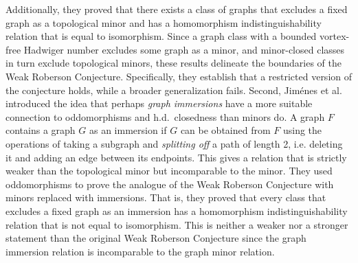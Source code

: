 \documentclass[11pt]{article}
\begin{document}
Additionally, they proved that there exists a class of graphs that excludes a fixed graph as a topological minor and has a homomorphism indistinguishability relation that is equal to isomorphism. 
Since a graph class with a bounded vortex-free Hadwiger number excludes some graph as a minor, and minor-closed classes in turn exclude topological minors, these results delineate the boundaries of the Weak Roberson Conjecture. Specifically, they establish that a restricted version of the conjecture holds, while a broader generalization fails.
Second, Jiménes et al. \cite{jiménez2026homomorphismcountingimmersionclosedclasses}
introduced the idea that perhaps \emph{graph immersions} have a more suitable connection to oddomorphisms and h.d.\ closedness than minors do. A graph $F$ contains a graph $G$ as an immersion if $G$ can be obtained from $F$ using the operations of taking a subgraph and \emph{splitting off} a path of length 2, i.e. deleting it and adding an edge between its endpoints. This gives a relation that is strictly weaker than the topological minor but incomparable to the minor.
They used oddomorphisms to prove the analogue of the Weak Roberson Conjecture with minors replaced with immersions. That is, they proved that every class that excludes a fixed graph as an immersion has a homomorphism indistinguishability relation that is not equal to isomorphism. 
This is neither a weaker nor a stronger statement than the original Weak Roberson Conjecture since the graph immersion relation is incomparable to the graph minor relation.
\par 
\end{document}
